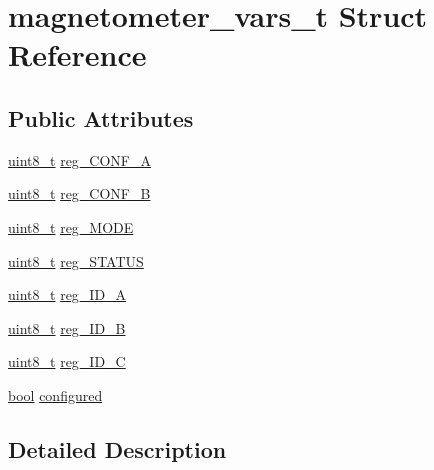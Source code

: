 \hypertarget{structmagnetometer__vars__t}{}\section{magnetometer\+\_\+vars\+\_\+t Struct Reference}
\label{structmagnetometer__vars__t}
\subsection*{Public Attributes}
\begin{DoxyCompactItemize}
\item 
\hyperlink{_p_e___types_8h_aba7bc1797add20fe3efdf37ced1182c5}{uint8\+\_\+t} \hyperlink{structmagnetometer__vars__t_a988937885a1fc35f3d454acd05987bec}{reg\+\_\+\+C\+O\+N\+F\+\_\+A}
\item 
\hyperlink{_p_e___types_8h_aba7bc1797add20fe3efdf37ced1182c5}{uint8\+\_\+t} \hyperlink{structmagnetometer__vars__t_a4cdcd8544a6f114ce176e8885cce3735}{reg\+\_\+\+C\+O\+N\+F\+\_\+B}
\item 
\hyperlink{_p_e___types_8h_aba7bc1797add20fe3efdf37ced1182c5}{uint8\+\_\+t} \hyperlink{structmagnetometer__vars__t_a6a993689edf4263f64dc82a7f7a67a5f}{reg\+\_\+\+M\+O\+DE}
\item 
\hyperlink{_p_e___types_8h_aba7bc1797add20fe3efdf37ced1182c5}{uint8\+\_\+t} \hyperlink{structmagnetometer__vars__t_acd0a28f11cb00349d7eda64aa412c378}{reg\+\_\+\+S\+T\+A\+T\+US}
\item 
\hyperlink{_p_e___types_8h_aba7bc1797add20fe3efdf37ced1182c5}{uint8\+\_\+t} \hyperlink{structmagnetometer__vars__t_ac4b3abaa6b37861ea66ee50555c237a1}{reg\+\_\+\+I\+D\+\_\+A}
\item 
\hyperlink{_p_e___types_8h_aba7bc1797add20fe3efdf37ced1182c5}{uint8\+\_\+t} \hyperlink{structmagnetometer__vars__t_a1c19cb325b72956c635485d2501c3a33}{reg\+\_\+\+I\+D\+\_\+B}
\item 
\hyperlink{_p_e___types_8h_aba7bc1797add20fe3efdf37ced1182c5}{uint8\+\_\+t} \hyperlink{structmagnetometer__vars__t_a94342a4eaba965643d77e850e2979378}{reg\+\_\+\+I\+D\+\_\+C}
\item 
\hyperlink{_p_e___types_8h_a97a80ca1602ebf2303258971a2c938e2}{bool} \hyperlink{structmagnetometer__vars__t_ab5fc3257561c93ec453ec733433ee1b1}{configured}
\end{DoxyCompactItemize}


\subsection{Detailed Description}


